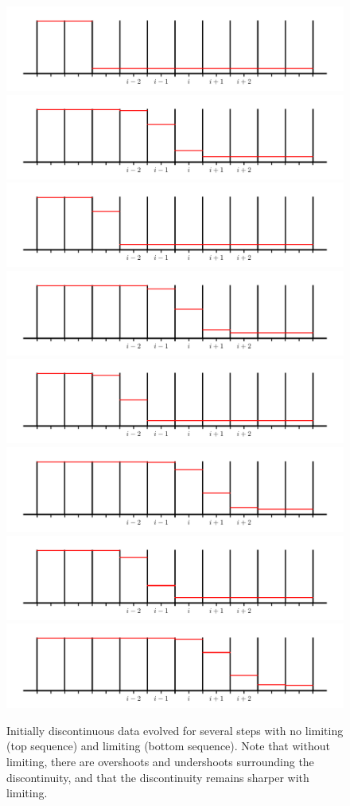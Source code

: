 \begin{figure}[p!]
\vskip 0.5in
\includegraphics[width=0.495\linewidth]{rea-start_001}\hspace{0.02em}
\includegraphics[width=0.495\linewidth]{rea-start_005} \\
\includegraphics[width=0.495\linewidth]{rea-start_002}\hspace{0.02em}
\includegraphics[width=0.495\linewidth]{rea-start_006} \\
\includegraphics[width=0.495\linewidth]{rea-start_003}\hspace{0.02em}
\includegraphics[width=0.495\linewidth]{rea-start_007} \\
\includegraphics[width=0.495\linewidth]{rea-start_004}\hspace{0.02em}
\includegraphics[width=0.495\linewidth]{rea-start_008} \\
\caption[The effect of limiters on initially discontinuous data.]{\label{fig:limitingex}Initially discontinuous data evolved for several steps with
  no limiting (top sequence) and limiting (bottom sequence).  Note
  that without limiting, there are overshoots and undershoots
  surrounding the discontinuity, and that the discontinuity remains
  sharper with limiting.}
\clearpage
\end{figure}

